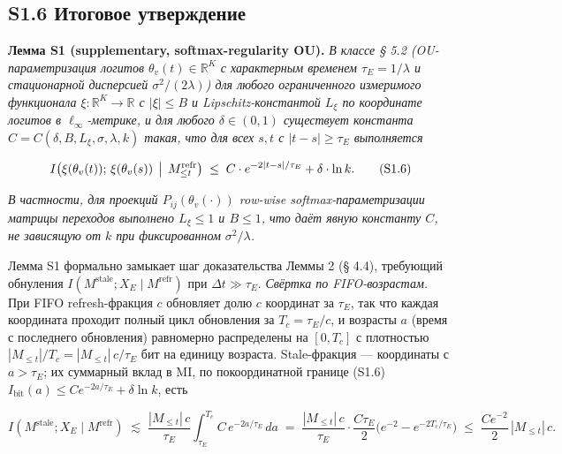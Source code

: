\documentclass[pdflatex,sn-mathphys-ay]{sn-jnl}
\begin{document}
\subsection*{S1.6 Итоговое утверждение}\label{s1.6-ux438ux442ux43eux433ux43eux432ux43eux435-ux443ux442ux432ux435ux440ux436ux434ux435ux43dux438ux435}



\textbf{Лемма S1 (supplementary, softmax-regularity OU).} \emph{В классе § 5.2 (OU-параметризация логитов \(\theta_v(t) \in \mathbb{R}^K\) с характерным временем \(\tau_E = 1/\lambda\) и стационарной дисперсией \(\sigma^2/(2\lambda)\)) для любого ограниченного измеримого функционала \(\xi: \mathbb{R}^K \to \mathbb{R}\) с \(|\xi| \le B\) и Lipschitz-константой \(L_\xi\) по координате логитов в \(\ell_\infty\)-метрике, и для любого \(\delta \in (0, 1)\) существует константа \(C = C(\delta, B, L_\xi, \sigma, \lambda, k)\) такая, что для всех \(s, t\) с \(|t-s| \ge \tau_E\) выполняется}



\begin{equation}I\bigl(\xi(\theta_v(t));\, \xi(\theta_v(s)) \,\bigm|\, M_{\le t}^{\text{refr}}\bigr) \;\le\; C \cdot e^{-2|t-s|/\tau_E} + \delta \cdot \ln k. \tag{S1.6}\end{equation}



\emph{В частности, для проекций \(P_{ij}(\theta_v(\cdot))\) row-wise softmax-параметризации матрицы переходов выполнено \(L_\xi \le 1\) и \(B \le 1\), что даёт явную константу \(C\), не зависящую от \(k\) при фиксированном \(\sigma^2/\lambda\).}



Лемма S1 формально замыкает шаг доказательства Леммы 2 (§ 4.4), требующий обнуления \(I(M^{\text{stale}}; X_E \mid M^{\text{refr}})\) при \(\Delta t \gg \tau_E\). \emph{Свёртка по FIFO-возрастам.} При FIFO refresh-фракция \(c\) обновляет долю \(c\) координат за \(\tau_E\), так что каждая координата проходит полный цикл обновления за \(T_c = \tau_E/c\), и возрасты \(a\) (время с последнего обновления) равномерно распределены на \([0, T_c]\) с плотностью \(|M_{\le t}|/T_c = |M_{\le t}|\,c/\tau_E\) бит на единицу возраста. Stale-фракция --- координаты с \(a > \tau_E\); их суммарный вклад в MI, по покоординатной границе (S1.6) \(I_{\text{bit}}(a) \le C e^{-2a/\tau_E} + \delta\ln k\), есть



\[I(M^{\text{stale}}; X_E \mid M^{\text{refr}}) \;\lesssim\; \frac{|M_{\le t}|\,c}{\tau_E}\int_{\tau_E}^{T_c} C\,e^{-2a/\tau_E}\,da \;=\; \frac{|M_{\le t}|\,c}{\tau_E}\cdot\frac{C\tau_E}{2}\bigl(e^{-2}-e^{-2T_c/\tau_E}\bigr) \;\le\; \frac{C e^{-2}}{2}\,|M_{\le t}|\,c.\]
\end{document}
